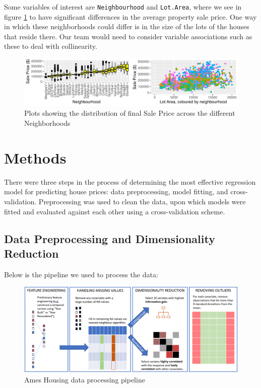 \documentclass[aoas]{imsart}
\numberwithin{equation}{section}
\theoremstyle{plain}
\theoremstyle{remark}
\begin{document}
Some variables of interest are \texttt{Neighbourhood} and
\texttt{Lot.Area}, where we see in figure \ref{neighbourhood} to have
significant differences in the average property sale price. One way in
which these neighborhoods could differ is in the size of the lots of the
houses that reside there. Our team would need to consider variable
associations such as these to deal with collinearity.

\begin{figure}
\centering
\includegraphics{STAT-444-FINAL-PROJECT-PAPER_files/figure-latex/unnamed-chunk-4-1.pdf}
\caption{Plots showing the distribution of final Sale Price across the
different Neighborhoods\label{neighbourhood}}
\end{figure}

\hypertarget{methods}{%
\section{Methods}\label{methods}}

There were three steps in the process of determining the most effective
regression model for predicting house prices: data preprocessing, model
fitting, and cross-validation. Preprocessing was used to clean the data,
upon which models were fitted and evaluated against each other using a
cross-validation scheme.

\hypertarget{data-preprocessing-and-dimensionality-reduction}{%
\subsection{Data Preprocessing and Dimensionality
Reduction}\label{data-preprocessing-and-dimensionality-reduction}}

Below is the pipeline we used to process the data:

\begin{figure}
\centering
\includegraphics[width=5.20833in,height=\textheight]{images/EDA_PREPROCESSING.png}
\caption{Ames Housing data processing pipeline}
\end{figure}
\end{document}
